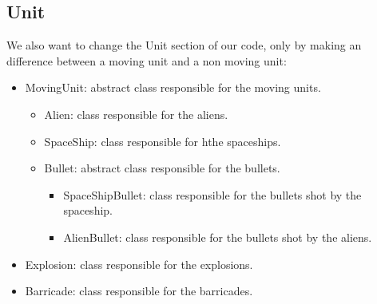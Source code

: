 \documentclass[10pt]{article}
\begin{document}
\subsection*{Unit}
We also want to change the Unit section of our code, only by making an difference between a moving unit and a non moving unit:
\begin{itemize}
	\item MovingUnit: abstract class responsible for the moving units.
	\begin{itemize}
		\item Alien: class responsible for the aliens.
		\item SpaceShip: class responsible for hthe spaceships.
		\item Bullet: abstract class responsible for the bullets.
		\begin{itemize}
			\item SpaceShipBullet: class responsible for the bullets shot by the spaceship.
			\item AlienBullet: class responsible for the bullets shot by the aliens.
		\end{itemize}
	\end{itemize}
	\item Explosion: class responsible for the explosions.
	\item Barricade: class responsible for the barricades.
\end{itemize}
\end{document}
